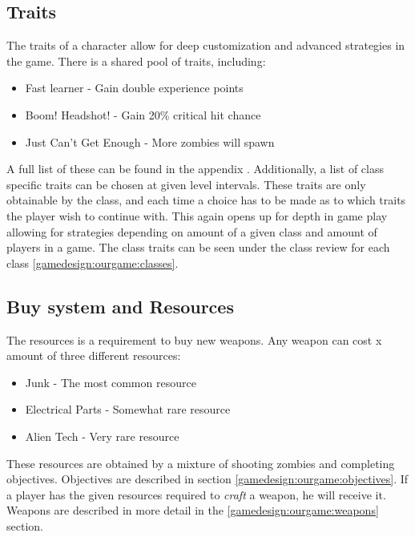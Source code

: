 \subsection*{Traits}\label{gamedesign:ourgame:traits}
The traits of a character allow for deep customization and advanced strategies in the game. There is a shared pool of traits, including:
\begin{itemize}
\item Fast learner - Gain double experience points
\item Boom! Headshot!  - Gain 20\% critical hit chance
\item Just Can’t Get Enough - More zombies will spawn
\end{itemize} 
A full list of these can be found in the appendix . Additionally, a list of class specific traits can be chosen at given level intervals. These traits are only obtainable by the class, and each time a choice has to be made as to which traits the player wish to continue with. This again opens up for depth in game play allowing for strategies depending on amount of a given class and amount of players in a game. The class traits can be seen under the class review for each class \ref{gamedesign:ourgame:classes}.

\subsection*{Buy system and Resources}\label{gamedesign:ourgame:crafting}
The resources is a requirement to buy new weapons. Any weapon can cost x amount of three different resources:
\begin{itemize}
\item Junk - The most common resource
\item Electrical Parts - Somewhat rare resource
\item Alien Tech - Very rare resource 
\end{itemize}
These resources are obtained by a mixture of shooting zombies and completing objectives. Objectives are described in section \ref{gamedesign:ourgame:objectives}. If a player has the given resources required to \emph{craft} a weapon, he will receive it. Weapons are described in more detail in the \ref{gamedesign:ourgame:weapons} section.

